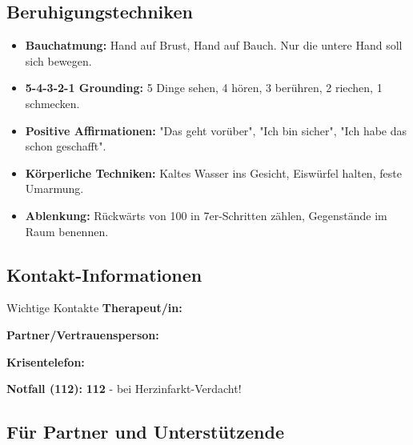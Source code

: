 \subsection{Beruhigungstechniken}

\begin{itemize}
\item \textbf{Bauchatmung:} Hand auf Brust, Hand auf Bauch. Nur die untere Hand soll sich bewegen.
\item \textbf{5-4-3-2-1 Grounding:} 5 Dinge sehen, 4 hören, 3 berühren, 2 riechen, 1 schmecken.
\item \textbf{Positive Affirmationen:} "Das geht vorüber", "Ich bin sicher", "Ich habe das schon geschafft".
\item \textbf{Körperliche Techniken:} Kaltes Wasser ins Gesicht, Eiswürfel halten, feste Umarmung.
\item \textbf{Ablenkung:} Rückwärts von 100 in 7er-Schritten zählen, Gegenstände im Raum benennen.
\end{itemize}

\subsection{Kontakt-Informationen}

\begin{ctmmBlueBox}{Wichtige Kontakte}
\textbf{Therapeut/in:} 

\textbf{Partner/Vertrauensperson:} 

\textbf{Krisentelefon:} 

\textbf{Notfall (112):} \textcolor{ctmmRed}{\textbf{112}} - bei Herzinfarkt-Verdacht!
\end{ctmmBlueBox}

\subsection{Für Partner und Unterstützende}

